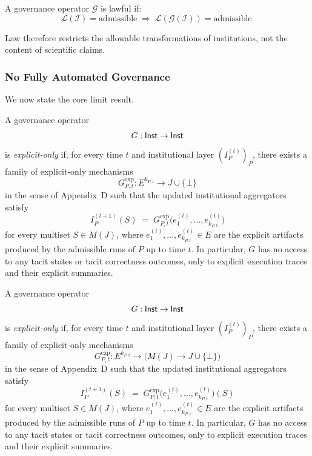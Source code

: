 \begin{definition}
A governance operator $\mathcal{G}$ is lawful if:
\[
\mathcal{L}(\mathcal{I}) = \text{admissible}
\;\Rightarrow\;
\mathcal{L}(\mathcal{G}(\mathcal{I})) = \text{admissible}.
\]
\end{definition}

Law therefore restricts the allowable transformations of institutions, not
the content of scientific claims.

\subsubsection{No Fully Automated Governance}

We now state the core limit result.
\begin{definition}\label{def:F-explicit-only-governance}
A governance operator
\[
  G : \mathsf{Inst} \to \mathsf{Inst}
\]
is \emph{explicit-only} if, for every time $t$ and institutional layer $(I^{(t)}_P)_P$, there exists a family of explicit-only mechanisms
\[
  G^{\mathrm{exp}}_{P,t} : E^{k_{P,t}} \to J \cup \{\bot\}
\]
in the sense of Appendix~D such that the updated institutional aggregators satisfy
\[
  I^{(t+1)}_P(S)
  \;=\;
  G^{\mathrm{exp}}_{P,t}\bigl(e^{(t)}_1, \dots, e^{(t)}_{k_{P,t}}\bigr)
\]
for every multiset $S \in M(J)$, where $e^{(t)}_1, \dots, e^{(t)}_{k_{P,t}} \in E$ are the explicit artifacts produced by the admissible runs of $P$ up to time $t$. In particular, $G$ has no access to any tacit states or tacit correctness outcomes, only to explicit execution traces and their explicit summaries.
\end{definition}
\begin{definition}\label{def:F-explicit-only-governance}
A governance operator
\[
  G : \mathsf{Inst} \to \mathsf{Inst}
\]
is \emph{explicit-only} if, for every time $t$ and institutional layer $(I^{(t)}_P)_P$, there exists a family of explicit-only mechanisms
\[
  G^{\mathrm{exp}}_{P,t} : E^{k_{P,t}} \to \bigl(M(J) \to J \cup \{\bot\}\bigr)
\]
in the sense of Appendix~D such that the updated institutional aggregators satisfy
\[
  I^{(t+1)}_P(S)
  \;=\;
  G^{\mathrm{exp}}_{P,t}\bigl(e^{(t)}_1, \dots, e^{(t)}_{k_{P,t}}\bigr)(S)
\]
for every multiset $S \in M(J)$, where $e^{(t)}_1, \dots, e^{(t)}_{k_{P,t}} \in E$ are the explicit artifacts produced by the admissible runs of $P$ up to time $t$. In particular, $G$ has no access to any tacit states or tacit correctness outcomes, only to explicit execution traces and their explicit summaries.
\end{definition}

